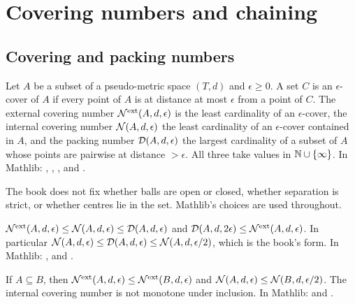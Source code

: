 \chapter{Covering numbers and chaining}
\label{chap:entropy}

\section{Covering and packing numbers}

\begin{definition}
  \label{def:han-4-1}
  \mathlibok
  Let $A$ be a subset of a pseudo-metric space $(T,d)$ and $\epsilon\ge0$. A set $C$ is an $\epsilon$-cover of $A$ if every point of $A$ is at distance at most $\epsilon$ from a point of $C$. The external covering number $\mathcal{N}^{\mathrm{ext}}(A,d,\epsilon)$ is the least cardinality of an $\epsilon$-cover, the internal covering number $\mathcal{N}(A,d,\epsilon)$ the least cardinality of an $\epsilon$-cover contained in $A$, and the packing number $\mathcal{D}(A,d,\epsilon)$ the largest cardinality of a subset of $A$ whose points are pairwise at distance $>\epsilon$. All three take values in $\mathbb{N}\cup\{\infty\}$.
  In Mathlib: , , ,  and .
\end{definition}
\begin{remark}
  The book does not fix whether balls are open or closed, whether separation is strict, or whether centres lie in the set. Mathlib's choices are used throughout.
\end{remark}

\begin{lemma}
  \label{lem:covering-packing}
  \mathlibok
  $\mathcal{N}^{\mathrm{ext}}(A,d,\epsilon)\le\mathcal{N}(A,d,\epsilon)\le\mathcal{D}(A,d,\epsilon)$ and $\mathcal{D}(A,d,2\epsilon)\le\mathcal{N}^{\mathrm{ext}}(A,d,\epsilon)$. In particular $\mathcal{N}(A,d,\epsilon)\le\mathcal{D}(A,d,\epsilon)\le\mathcal{N}(A,d,\epsilon/2)$, which is the book's form.
  In Mathlib: ,  and .
\end{lemma}

\begin{lemma}[Subsets]
  \label{lem:covering-subset}
  \mathlibok
  If $A\subseteq B$, then $\mathcal{N}^{\mathrm{ext}}(A,d,\epsilon)\le\mathcal{N}^{\mathrm{ext}}(B,d,\epsilon)$ and $\mathcal{N}(A,d,\epsilon)\le\mathcal{N}(B,d,\epsilon/2)$. The internal covering number is not monotone under inclusion.
  In Mathlib:  and .
\end{lemma}

